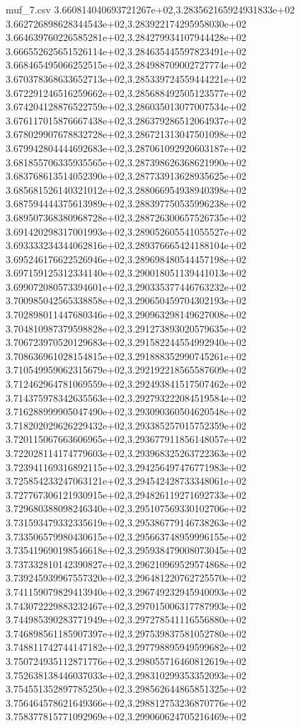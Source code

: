 \begin{filecontents*}{muf_7.csv}
3.660814040693721267e+02,3.283562165924931833e+02
3.662726898628344543e+02,3.283922174295958030e+02
3.664639760226585281e+02,3.284279934107944428e+02
3.666552625651526114e+02,3.284635445597823491e+02
3.668465495066252515e+02,3.284988709002727774e+02
3.670378368633652713e+02,3.285339724559444221e+02
3.672291246516259662e+02,3.285688492505123577e+02
3.674204128876522759e+02,3.286035013077007534e+02
3.676117015876667438e+02,3.286379286512064937e+02
3.678029907678832728e+02,3.286721313047501098e+02
3.679942804444692683e+02,3.287061092920603187e+02
3.681855706335935565e+02,3.287398626368621990e+02
3.683768613514052390e+02,3.287733913628935625e+02
3.685681526140321012e+02,3.288066954938940398e+02
3.687594444375613989e+02,3.288397750535996238e+02
3.689507368380968728e+02,3.288726300657526735e+02
3.691420298317001993e+02,3.289052605541055527e+02
3.693333234344062816e+02,3.289376665424188104e+02
3.695246176622526946e+02,3.289698480544457198e+02
3.697159125312334140e+02,3.290018051139441013e+02
3.699072080573394601e+02,3.290335377446763232e+02
3.700985042565338858e+02,3.290650459704302193e+02
3.702898011447680346e+02,3.290963298149627008e+02
3.704810987379598828e+02,3.291273893020579635e+02
3.706723970520129683e+02,3.291582244554992940e+02
3.708636961028154815e+02,3.291888352990745261e+02
3.710549959062315679e+02,3.292192218565587609e+02
3.712462964781069559e+02,3.292493841517507462e+02
3.714375978342635563e+02,3.292793222084519584e+02
3.716288999905047490e+02,3.293090360504620548e+02
3.718202029626229432e+02,3.293385257015752359e+02
3.720115067663606965e+02,3.293677911856148057e+02
3.722028114174779603e+02,3.293968325263722363e+02
3.723941169316892115e+02,3.294256497476771983e+02
3.725854233247063121e+02,3.294542428733348061e+02
3.727767306121930915e+02,3.294826119271692733e+02
3.729680388098246340e+02,3.295107569330102706e+02
3.731593479332335619e+02,3.295386779146738263e+02
3.733506579980430615e+02,3.295663748959996155e+02
3.735419690198546618e+02,3.295938479008073045e+02
3.737332810142390827e+02,3.296210969529574868e+02
3.739245939967557320e+02,3.296481220762725570e+02
3.741159079829413940e+02,3.296749232945940093e+02
3.743072229883232467e+02,3.297015006317787993e+02
3.744985390283771949e+02,3.297278541116556880e+02
3.746898561185907397e+02,3.297539837581052780e+02
3.748811742744147182e+02,3.297798895949599682e+02
3.750724935112871776e+02,3.298055716460812619e+02
3.752638138446037033e+02,3.298310299353352093e+02
3.754551352897785250e+02,3.298562644865851325e+02
3.756464578621649366e+02,3.298812753236870776e+02
3.758377815771092969e+02,3.299060624705216469e+02

\end{filecontents*}

